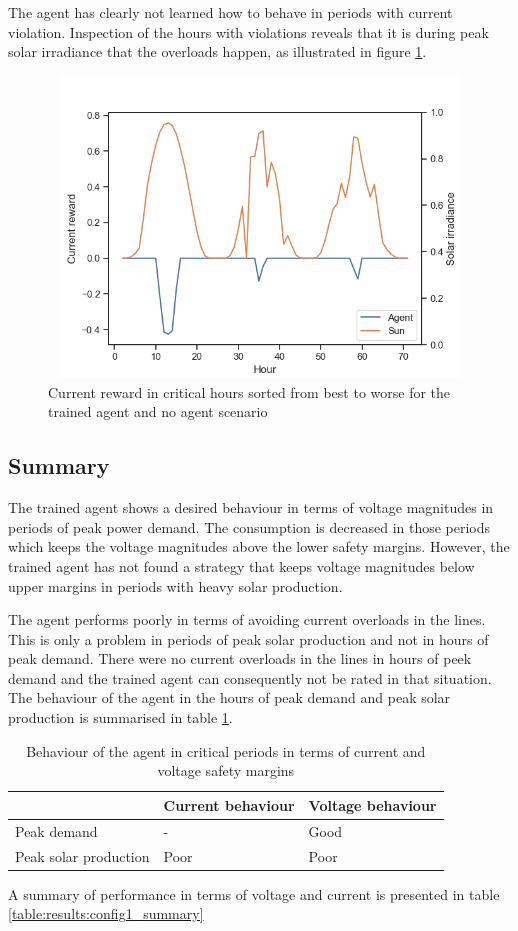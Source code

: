 \documentclass[class=book, crop=false]{standalone}
\begin{document}
The agent has clearly not learned how to behave in periods with current violation. Inspection of the hours with violations reveals that it is during peak solar irradiance that the overloads happen, as illustrated in figure \ref{fig:results:config1_bad_current}.


\begin{figure}[H]
    \center
\includegraphics[height=8cm, width=12cm]{figures/config1_bad_current.png}
    \caption[size = 9]{Current reward in critical hours sorted from best to worse for the trained agent and no agent scenario}
    \label{fig:results:config1_bad_current}
\end{figure}

\subsection{Summary}
The trained agent shows a desired behaviour in terms of voltage magnitudes in periods of peak power demand. The consumption is decreased in those periods which keeps the voltage magnitudes above the lower safety margins. However, the trained agent has not found a strategy that keeps voltage magnitudes below upper margins in periods with heavy solar production.

The agent performs poorly in terms of avoiding current overloads in the lines. This is only a problem in periods of peak solar production and not in hours of peak demand. There were no current overloads in the lines in hours of peek demand and the trained agent can consequently not be rated in that situation. The behaviour of the agent in the hours of peak demand and peak solar production is summarised in table \ref{table:results:config1_behaviour}.

\begin{table}[ht]
\center
\begin{tabular}{l|ll}
                      & Current behaviour     & Voltage behaviour \\
\hline
Peak demand           & - & Good              \\
Peak solar production & Poor                  & Poor \\
\hline
\end{tabular}
\caption{Behaviour of the agent in critical periods in terms of current and voltage safety margins}
\label{table:results:config1_behaviour}
\end{table}
A summary of performance in terms of voltage and current is presented in table \ref{table:results:config1_summary}
\end{document}
